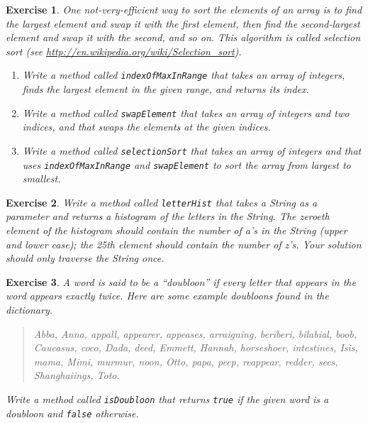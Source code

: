 \documentclass[12pt]{book}
\theoremstyle{exercise}
\newtheorem{exercise}{Exercise}[chapter]
\newcommand{\java}[1]{\verb"#1"}
\newcommand{\java}[1]{\lstinline{#1}} %
\begin{document}
\begin{exercise}
One not-very-efficient way to sort the elements of an array is to find the largest element and swap it with the first element, then find the second-largest element and swap it with the second, and so on.
This algorithm is called selection sort (see \url{http://en.wikipedia.org/wiki/Selection_sort}).

\begin{enumerate}

\item Write a method called \java{indexOfMaxInRange} that takes an array of integers, finds the largest element in the given range, and returns its {\em index}.

\item Write a method called \java{swapElement} that takes an array of integers and two indices, and that swaps the elements at the given indices.

\item Write a method called \java{selectionSort} that takes an array of integers and that uses \java{indexOfMaxInRange} and \java{swapElement} to sort the array from largest to smallest.

\end{enumerate}

\end{exercise}


\begin{exercise}
Write a method called \java{letterHist} that takes a String as a parameter and returns a histogram of the letters in the String.
The zeroeth element of the histogram should contain the number of a's in the String (upper and lower case); the 25th element should contain the number of z's.
Your solution should only traverse the String once.
\end{exercise}



\begin{exercise}
A word is said to be a ``doubloon'' if every letter that appears in the word appears exactly twice.
Here are some example doubloons found in the dictionary.

\begin{quote}
Abba, Anna, appall, appearer, appeases, arraigning, beriberi, bilabial, boob, Caucasus, coco, Dada, deed, Emmett, Hannah, horseshoer, intestines, Isis, mama, Mimi, murmur, noon, Otto, papa, peep, reappear, redder, sees, Shanghaiings, Toto.
\end{quote}

Write a method called \java{isDoubloon} that returns \java{true} if the given word is a doubloon and \java{false} otherwise.
\end{exercise}
\end{document}

